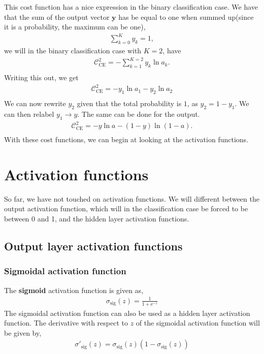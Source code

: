 \documentclass[a4paper,10pt]{article}
\newcommand{\e}[1]{\mathrm{e}^{#1}}
\begin{document}
This cost function has a nice expression in the binary classification case. We have that the sum of the output vector $\bm{y}$ has be equal to one when summed up(since it is a probability, the maximum can be one),
\begin{align*}
    \sum^K_{k=0} y_k = 1,
\end{align*}
we will in the binary classification case with $K=2$, have
\begin{align*}
    \mathcal{C}^2_\mathrm{CE} = - \sum^{K=2}_{k=1} y_{k} \ln a_{k}. \\
\end{align*}
Writing this out, we get
\begin{align*}
    \mathcal{C}^2_\mathrm{CE} = - y_1 \ln a_1 - y_2 \ln a_2 \\
\end{align*}
We can now rewrite $y_2$ given that the total probability is $1$, as $y_2 = 1 - y_1$. We can then relabel $y_1\rightarrow y$. The same can be done for the output.
\begin{align}
    \mathcal{C}^2_\mathrm{CE} = - y \ln a - (1 - y) \ln (1 - a). \\
    \label{eq:binary-cross-entropy}
\end{align}
With these cost functions, we can begin at looking at the activation functions.

\section{Activation functions}
So far, we have not touched on activation functions. We will different between the output activation function, which will in the classification case be forced to be between 0 and 1, and the hidden layer activation functions.
\subsection{Output layer activation functions}
\subsubsection{Sigmoidal activation function}
The \textbf{sigmoid} activation function is given as,
\begin{align}
    \sigma_\mathrm{sig} (z) = \frac{1}{1 + \e{-z}}
    \label{eq:sigmoidal-activation}
\end{align}
The sigmoidal activation function can also be used as a hidden layer activation function. The derivative with respect to $z$ of the sigmoidal activation function will be given by,
\begin{align}
    \sigma'_\mathrm{sig}(z) = \sigma_\mathrm{sig}(z)(1 - \sigma_\mathrm{sig}(z))
    \label{eq:sigmoidal-activation-derivative}
\end{align}
\end{document}
